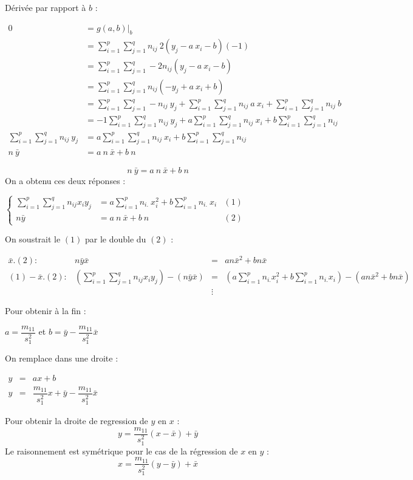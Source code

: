 Dérivée par rapport à $b$ :
\begin{center}
	$\begin{array}{RL}
		0 &= \left.g(a,b)\right|_b\\
		  &= \sum_{i=1}^{p} \sum_{j=1}^{q} n_{ij}\ 2(y_j - a\ x_i-b)(-1)\\
		  &= \sum_{i=1}^{p} \sum_{j=1}^{q} -2n_{ij}(y_j - a\ x_i - b)\\
		  &= \sum_{i=1}^{p} \sum_{j=1}^{q} n_{ij}(-y_j + a\ x_i + b)\\
		  &= \sum_{i=1}^{p} \sum_{j=1}^{q} -n_{ij}\ y_j + \sum_{i=1}^{p} \sum_{j=1}^{q} n_{ij}\ a\ x_i + \sum_{i=1}^{p} \sum_{j=1}^{q} n_{ij}\ b\\
		  &= -1 \sum_{i=1}^{p} \sum_{j=1}^{q} n_{ij}\ y_j + a \sum_{i=1}^{p} \sum_{j=1}^{q} n_{ij}\ x_i + b \sum_{i=1}^{p} \sum_{j=1}^{q} n_{ij}\\
		\sum_{i=1}^{p} \sum_{j=1}^{q} n_{ij}\ y_j &= a \sum_{i=1}^{p} \sum_{j=1}^{q} n_{ij}\ x_i + b \sum_{i=1}^{p} \sum_{j=1}^{q} n_{ij}\\
		n\ \bar{y} &= a\ n\ \bar{x} + b\ n
	\end{array}$
\end{center}
$$\boxed{n\ \bar{y} = a\ n\ \bar{x} + b\ n}$$
On a obtenu ces deux réponses :
\begin{center}
	$\left\{
	\begin{array}{RLC}
		\sum_{i=1}^{p} \sum_{j=1}^{q}n_{ij}x_iy_j &= a \sum_{i=1}^{p} n_{i.}\ x_i^2 + b \sum_{i=1}^{p} n_{i.}\ x_i &(1)\\
		n\bar{y} &= a\ n\ \bar{x} + b\ n&(2)
	\end{array}
	\right.$
\end{center}
On soustrait le $(1)$ par le double du $(2)$ :
\begin{center}
	$\begin{array}{RRCL}
		\bar{x}.(2) :& n\bar{y}\bar{x} &=& an\bar{x}^2 + bn\bar{x}\\
		(1) - \bar{x}.(2) :& \left(\sum_{i=1}^{p} \sum_{j=1}^{q} n_{ij}x_iy_j \right) - ( n\bar{y}\bar{x} ) &=& \left( a \sum_{i=1}^{p} n_{i.}x_i^2 + b\sum_{i=1}^{p} n_{i.}x_i \right) - \left( an\bar{x}^2 + bn\bar{x} \right)\\
        &&\vdots&
	\end{array}$
\end{center}
Pour obtenir à la fin :
\begin{center}
	$\boxed{a = \dfrac{m_{11}}{s_1^2}}$ et $\boxed{b = \bar{y} - \dfrac{m_{11}}{s_1^2} \bar{x}} $
\end{center}
On remplace dans une droite :
\begin{center}
	$\begin{array}{RRL}
		y&=&ax+b\\
		y&=&\dfrac{m_{11}}{s_1^2}x+\bar{y} - \dfrac{m_{11}}{s_1^2} \bar{x}
	\end{array}$
\end{center}
Pour obtenir la droite de regression de $y$ en $x$ :
$$\boxed{y = \dfrac{m_{11}}{s_1^2} (x - \bar{x}) + \bar{y}}$$
Le raisonnement est symétrique pour le cas de la régression de $x$ en $y$ :
$$\boxed{x = \dfrac{m_{11}}{s_1^2} (y - \bar{y}) + \bar{x}}$$





